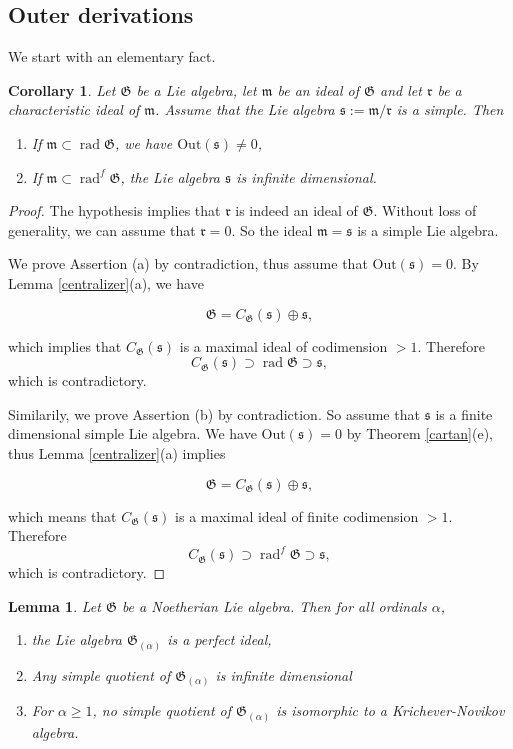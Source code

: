 \documentclass[11pt, letterpaper, reqno]{amsart}
\newtheorem{cor}[theorem]{Corollary}
\newtheorem{lemma}[theorem]{Lemma}
\theoremstyle{definition}
\newcommand{\rad}{\operatorname{rad}}
\newcommand{\fm}{\mathfrak{m}}
\newcommand{\fr}{\mathfrak{r}}
\newcommand{\fs}{\mathfrak{s}}
\newcommand{\fG}{\mathfrak{G}}
\newcommand{\Out}{\mathrm{Out}}
\begin{document}
\subsection{Outer derivations}
We start with an elementary fact.



\begin{cor}\label{quot} Let $\fG$ be a Lie algebra,
let $\fm$ be an ideal of $\fG$ and let
$\fr$ be a characteristic ideal of $\fm$.
 Assume that the Lie algebra 
$\fs:=\fm/\fr$ is a simple.
Then

\begin{enumerate}
\item[(a)] If $\fm\subset\rad\fG$, we have
$\Out(\fs)\neq 0$,
\item[(b)] If $\fm\subset\rad^f\fG$, the Lie algebra
$\fs$ is infinite dimensional.
\end{enumerate}
\end{cor}

\begin{proof} The hypothesis implies that
$\fr$ is indeed an ideal of $\fG$.
Without loss of generality, we can assume that $\fr=0$.
So the ideal $\fm=\fs$ is a simple Lie algebra.

We prove Assertion (a) by contradiction, thus
assume that $\Out(\fs)=0$. By Lemma \ref{centralizer}(a), we have

$$\fG= C_\fG(\fs)\oplus \fs,$$

\noindent which implies that 
$C_\fG(\fs)$ is a maximal ideal of codimension $>1$. Therefore
$$C_\fG(\fs)\supset\rad\fG\supset \fs,$$
\noindent which is contradictory.

Similarily, we prove Assertion (b) by contradiction. So assume that $\fs$ is a finite dimensional simple Lie algebra.
We have $\Out(\fs)=0$ by Theorem \ref{cartan}(e), thus 
Lemma \ref{centralizer}(a) implies

$$\fG=C_\fG(\fs)\oplus \fs,$$

\noindent which means that 
$C_\fG(\fs)$ is a maximal ideal of finite codimension $> 1$. Therefore
$$C_\fG(\fs)\supset\rad^f\fG\supset \fs,$$
\noindent which is contradictory.
\end{proof}

\begin{lemma}\label{prepa} Let $\fG$ be a  Noetherian Lie algebra. Then for all ordinals $\alpha$,
\begin{enumerate}
\item[(a)] the Lie algebra $\fG_{(\alpha)}$ is a perfect ideal,
\item[(b)] Any simple quotient of $\fG_{(\alpha)}$ is infinite dimensional
\item[(c)] For $\alpha\geq 1$, no simple quotient of $\fG_{(\alpha)}$ is isomorphic to a Krichever-Novikov algebra.
\end{enumerate}
\end{lemma}
\end{document}
